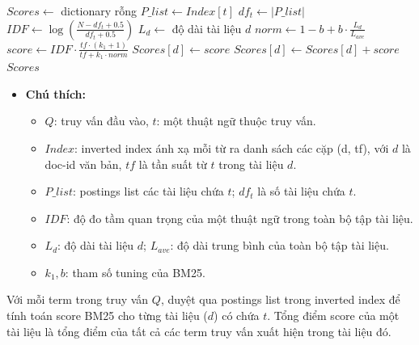 \documentclass[12pt, a4paper]{article}
\begin{document}
\begin{algorithm}[H]
\caption{BM25\_ScoreComputation}\label{alg:bm25}
\begin{algorithmic}[1]
\State $Scores \gets$ dictionary rỗng
        \State $P\_list \gets Index[t]$
        \State $df_t \gets |P\_list|$
        \State $IDF \gets \log \left( \frac{N - df_t + 0.5}{df_t + 0.5} \right)$
            \State $L_d \gets$ độ dài tài liệu $d$
            \State $norm \gets 1 - b + b \cdot \frac{L_d}{L_{ave}}$
            \State $score \gets IDF \cdot \frac{tf \cdot (k_1 + 1)}{tf + k_1 \cdot norm}$
                \State $Scores[d] \gets score$
            \Else
                \State $Scores[d] \gets Scores[d] + score$
            \EndIf
        \EndFor
    \EndIf
\EndFor
\State \Return $Scores$
\end{algorithmic}
\end{algorithm}

\begin{itemize}
    \item \textbf{Chú thích:}
    \begin{itemize}
        \item $Q$: truy vấn đầu vào, $t$: một thuật ngữ thuộc truy vấn.
        \item $Index$: inverted index ánh xạ mỗi từ ra danh sách các cặp (d, tf), với $d$ là doc-id văn bản, $tf$ là tần suất từ $t$ trong tài liệu $d$.
        \item $P\_list$: postings list các tài liệu chứa $t$; $df_t$ là số tài liệu chứa $t$.
        \item $IDF$: độ đo tầm quan trọng của một thuật ngữ trong toàn bộ tập tài liệu.
        \item $L_d$: độ dài tài liệu $d$; $L_{ave}$: độ dài trung bình của toàn bộ tập tài liệu.
        \item $k_1, b$: tham số tuning của BM25.
    \end{itemize}
\end{itemize}

Với mỗi term trong truy vấn $Q$, duyệt qua postings list trong inverted index để tính toán score BM25 cho từng tài liệu ($d$) có chứa $t$. Tổng điểm score của một tài liệu là tổng điểm của tất cả các term truy vấn xuất hiện trong tài liệu đó.
\end{document}
